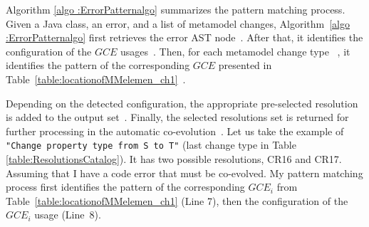 Algorithm \ref{algo :ErrorPatternalgo} summarizes the pattern matching process. 
Given a Java class, an error, and a list of metamodel changes, Algorithm~\ref{algo :ErrorPatternalgo} first retrieves the error AST node~{\small{}}. After that, it identifies the configuration of the $GCE$ usages~{\small{}}. Then, for each metamodel change type ~{\small{}}, it identifies the pattern of the corresponding $GCE$ presented in Table~\ref{table:locationofMMelemen_ch1}~{\small{}}.

Depending on the detected configuration, the appropriate pre-selected resolution is added to the output set~{\small{}}.
Finally, the selected resolutions set is returned for further processing in the automatic co-evolution~{\small{}}. 
Let us take the example of \texttt{"Change property type from S to T"} (last change type in Table \ref{table:ResolutionsCatalog}). It has two possible resolutions, CR16 and CR17. Assuming that I have a code error that must be co-evolved. My pattern matching process first identifies the pattern of the corresponding $GCE_i$ from Table~\ref{table:locationofMMelemen_ch1} (Line 7), then the configuration of the $GCE_i$ usage (Line~8). 

